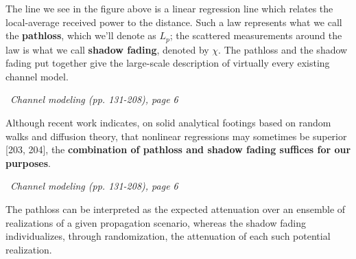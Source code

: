 \documentclass[a4paper, 12pt]{book}
\begin{document}
The line we see in the figure above is a linear regression line which relates the local-average received power to the distance. Such a law represents what we call the \textbf{pathloss}, which we'll denote as $L_p$; the scattered measurements around the law is what we call \textbf{shadow fading}, denoted by $\chi$.
The pathloss and the shadow fading put together give the large-scale description of virtually every existing channel model.

\begin{yellowbox}
\faBook\ \textit{Channel modeling (pp. 131-208), page 6}

Although recent work indicates, on solid analytical footings based on random walks and diffusion theory, that nonlinear regressions may sometimes be superior [203, 204], the \textbf{combination of pathloss and shadow fading suffices for our purposes}.
\end{yellowbox}

\begin{yellowbox}
\faBook\ \textit{Channel modeling (pp. 131-208), page 6}

The pathloss can be interpreted as the expected attenuation over an ensemble of realizations of a given propagation scenario, whereas the shadow fading individualizes, through randomization, the attenuation of each such potential realization.
\end{yellowbox}

\newpage
\end{document}

